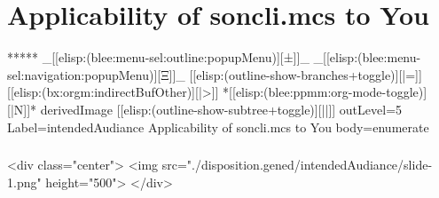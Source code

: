 \section{Applicability of soncli.mcs to You}


\begin{whenOrg}
*****  _[[elisp:(blee:menu-sel:outline:popupMenu)][±]]_ _[[elisp:(blee:menu-sel:navigation:popupMenu)][Ξ]]_ [[elisp:(outline-show-branches+toggle)][|=]] [[elisp:(bx:orgm:indirectBufOther)][|>]] *[[elisp:(blee:ppmm:org-mode-toggle)][|N]]*  derivedImage [[elisp:(outline-show-subtree+toggle)][||]] outLevel=5 Label=intendedAudiance Applicability of soncli.mcs to You body=enumerate
\end{whenOrg}

\begin{htmlonly}

\begin{frame}[fragile,plain,label=intendedAudiance]
    \frametitle{}
    \framesubtitle{}
    \begin{rawhtml}
<div class="center">
<img src="./disposition.gened/intendedAudiance/slide-1.png" height="500">
</div>
    \end{rawhtml}
\end{frame}
\end{htmlonly}

